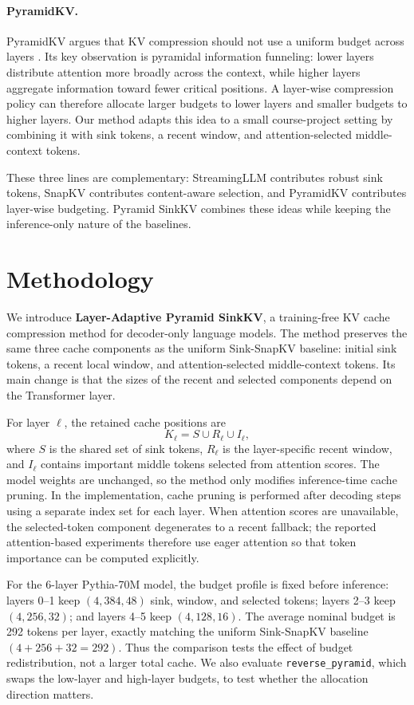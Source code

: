 \documentclass{article}
\begin{document}
\paragraph{PyramidKV.}
PyramidKV argues that KV compression should not use a uniform budget across
layers \citep{cai2024pyramidkv}. Its key observation is pyramidal information
funneling: lower layers distribute attention more broadly across the context,
while higher layers aggregate information toward fewer critical positions. A
layer-wise compression policy can therefore allocate larger budgets to lower
layers and smaller budgets to higher layers. Our method adapts this idea to a
small course-project setting by combining it with sink tokens, a recent window,
and attention-selected middle-context tokens.

These three lines are complementary: StreamingLLM contributes robust sink
tokens, SnapKV contributes content-aware selection, and PyramidKV contributes
layer-wise budgeting. Pyramid SinkKV combines these ideas while keeping the
inference-only nature of the baselines.

\section{Methodology}
\label{sec:methodology}

We introduce \textbf{Layer-Adaptive Pyramid SinkKV}, a training-free KV cache
compression method for decoder-only language models. The method preserves the
same three cache components as the uniform Sink-SnapKV baseline: initial sink
tokens, a recent local window, and attention-selected middle-context tokens. Its
main change is that the sizes of the recent and selected components depend on
the Transformer layer.

For layer $\ell$, the retained cache positions are
\[
K_\ell = S \cup R_\ell \cup I_\ell ,
\]
where $S$ is the shared set of sink tokens, $R_\ell$ is the layer-specific recent
window, and $I_\ell$ contains important middle tokens selected from attention
scores. The model weights are unchanged, so the method only modifies
inference-time cache pruning. In the implementation, cache pruning is performed
after decoding steps using a separate index set for each layer. When attention
scores are unavailable, the selected-token component degenerates to a recent
fallback; the reported attention-based experiments therefore use eager attention
so that token importance can be computed explicitly.

For the 6-layer Pythia-70M model, the budget profile is fixed before inference:
layers 0--1 keep $(4,384,48)$ sink, window, and selected tokens; layers 2--3 keep
$(4,256,32)$; and layers 4--5 keep $(4,128,16)$. The average nominal budget is
292 tokens per layer, exactly matching the uniform Sink-SnapKV baseline
$(4+256+32=292)$. Thus the comparison tests the effect of budget redistribution,
not a larger total cache. We also evaluate \texttt{reverse\_pyramid}, which
swaps the low-layer and high-layer budgets, to test whether the allocation
direction matters.
\end{document}
